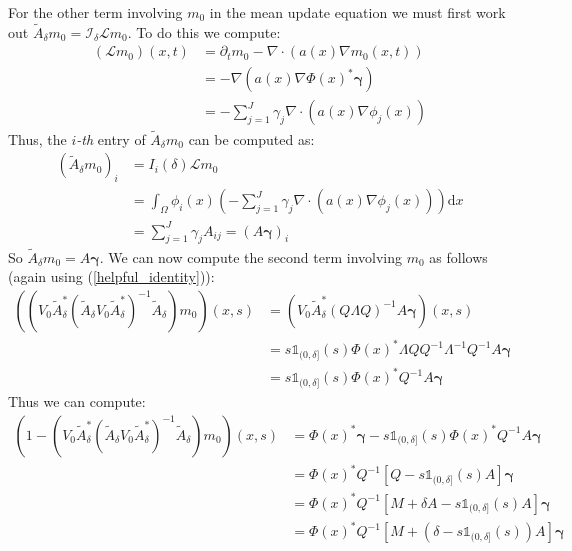 \documentclass{article}
\theoremstyle{definition}
\theoremstyle{remark}
\theoremstyle{remark}
\begin{document}
\noindent For the other term involving $m_0$ in the mean update equation we must first work out $\tilde{A}_{\delta}m_{0}=\mathcal{I}_{\delta}\mathcal{L}m_{0}$. To do this we compute:
\begin{align*}
    (\mathcal{L}m_{0})(x,t)&=\partial_{t}m_{0}-\nabla\cdot(a(x)\nabla m_{0}(x,t)) \\
    &=-\nabla(a(x)\nabla\Phi(x)^{*}\boldsymbol{\gamma}) \\
    &=-\sum_{j=1}^{J}\gamma_{j}\nabla\cdot(a(x)\nabla\phi_{j}(x))
\end{align*}
Thus, the $i$\textit{-th} entry of $\tilde{A}_{\delta}m_{0}$ can be computed as:
\begin{align*}
    (\tilde{A}_{\delta}m_{0})_{i} &= I_{i}(\delta)\mathcal{L}m_{0} \\
    &= \int_{\Omega}\phi_{i}(x)\left(-\sum_{j=1}^{J}\gamma_{j}\nabla\cdot(a(x)\nabla\phi_{j}(x))\right)\mathrm{d}x \\
    &= \sum_{j=1}^{J}\gamma_{j}A_{ij} = (A\boldsymbol{\gamma})_{i}
\end{align*}
So $\tilde{A}_{\delta}m_{0}=A\boldsymbol{\gamma}$.
We can now compute the second term involving $m_{0}$ as follows (again using (\ref{helpful_identity})):
\begin{align*}
    ((V_{0}\tilde{A}_{\delta}^{*}(\tilde{A}_{\delta}V_{0}\tilde{A}_{\delta}^{*})^{-1}\tilde{A}_{\delta})m_{0})(x,s) &= (V_{0}\tilde{A}_{\delta}^{*}(Q\Lambda Q)^{-1}A\boldsymbol{\gamma})(x,s) \\
    &= s\mathbb{1}_{(0,\delta]}(s)\Phi(x)^{*}\Lambda QQ^{-1}\Lambda^{-1}Q^{-1}A\boldsymbol{\gamma}\\
    &=s\mathbb{1}_{(0,\delta]}(s)\Phi(x)^{*}Q^{-1}A\boldsymbol{\gamma}
\end{align*}
Thus we can compute:
\begin{align*}
    (1-(V_{0}\tilde{A}_{\delta}^{*}(\tilde{A}_{\delta}V_{0}\tilde{A}_{\delta}^{*})^{-1}\tilde{A}_{\delta})m_{0})(x,s)&=\Phi(x)^{*}\boldsymbol{\gamma}-s\mathbb{1}_{(0,\delta]}(s)\Phi(x)^{*}Q^{-1}A\boldsymbol{\gamma} \\
    &= \Phi(x)^{*}Q^{-1}[Q - s\mathbb{1}_{(0,\delta]}(s)A]\boldsymbol{\gamma} \\
    &=\Phi(x)^{*}Q^{-1}[M+\delta A - s\mathbb{1}_{(0,\delta]}(s)A]\boldsymbol{\gamma} \\
    &=\Phi(x)^{*}Q^{-1}[M + (\delta-s\mathbb{1}_{(0,\delta]}(s))A]\boldsymbol{\gamma}
\end{align*}
\end{document}
